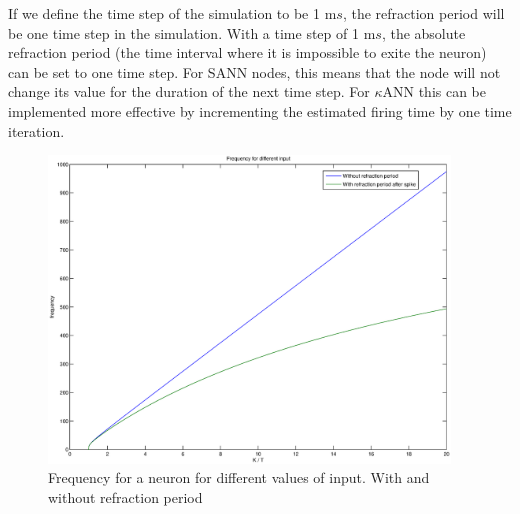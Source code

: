 If we define the time step of the simulation to be 1 m$s$, the refraction period will be one time step in the simulation.
With a time step of 1 m$s$, the absolute refraction period (the time interval where it is impossible to exite the neuron) can be set to one time step. 
For SANN nodes, this means that the node will not change its value for the duration of the next time step. 
For $\kappa$ANN this can be implemented more effective by incrementing the estimated firing time by one time iteration. 


\begin{figure}[bhtp]
	\label{figFrekvensMedOgUtenRefractionPeriod}
	\begin{center}
		\includegraphics[width=0.95\textwidth]{frekvensPlotRefractionPeriod.eps}
	\end{center}
	\caption{Frequency for a neuron for different values of input. With and without refraction period}
\end{figure}






